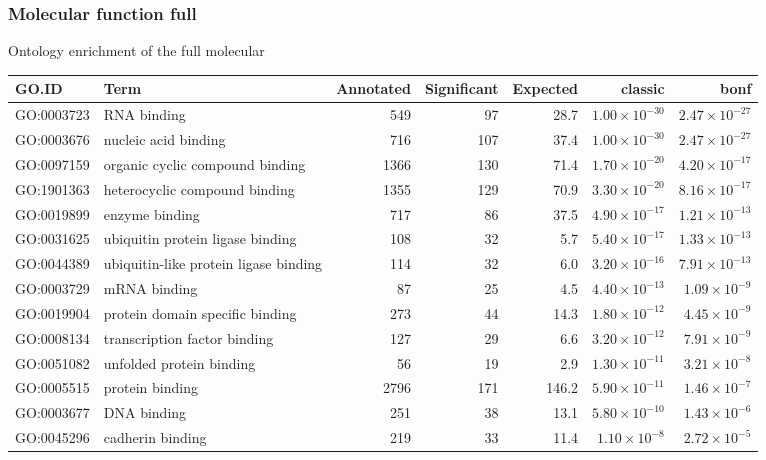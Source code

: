 \subsubsection{Molecular function full}
Ontology enrichment of the full molecular
\begin{table}[ht]
\centering
\begin{adjustbox}{max width=\textwidth}
\begin{tabular}{llrrrrr}
  \hline
GO.ID & Term & Annotated & Significant & Expected & classic & bonf \\ 
  \hline
GO:0003723 & RNA binding & 549 & 97 & 28.7 & $1.00 \times 10^{-30}$ & $2.47 \times 10^{-27}$ \\ 
  GO:0003676 & nucleic acid binding & 716 & 107 & 37.4 & $1.00 \times 10^{-30}$ & $2.47 \times 10^{-27}$ \\ 
  GO:0097159 & organic cyclic compound binding & 1366 & 130 & 71.4 & $1.70 \times 10^{-20}$ & $4.20 \times 10^{-17}$ \\ 
  GO:1901363 & heterocyclic compound binding & 1355 & 129 & 70.9 & $3.30 \times 10^{-20}$ & $8.16 \times 10^{-17}$ \\ 
  GO:0019899 & enzyme binding & 717 & 86 & 37.5 & $4.90 \times 10^{-17}$ & $1.21 \times 10^{-13}$ \\ 
  GO:0031625 & ubiquitin protein ligase binding & 108 & 32 & 5.7 & $5.40 \times 10^{-17}$ & $1.33 \times 10^{-13}$ \\ 
  GO:0044389 & ubiquitin-like protein ligase binding & 114 & 32 & 6.0 & $3.20 \times 10^{-16}$ & $7.91 \times 10^{-13}$ \\ 
  GO:0003729 & mRNA binding & 87 & 25 & 4.5 & $4.40 \times 10^{-13}$ & $1.09 \times 10^{-9}$ \\ 
  GO:0019904 & protein domain specific binding & 273 & 44 & 14.3 & $1.80 \times 10^{-12}$ & $4.45 \times 10^{-9}$ \\ 
  GO:0008134 & transcription factor binding & 127 & 29 & 6.6 & $3.20 \times 10^{-12}$ & $7.91 \times 10^{-9}$ \\ 
  GO:0051082 & unfolded protein binding & 56 & 19 & 2.9 & $1.30 \times 10^{-11}$ & $3.21 \times 10^{-8}$ \\ 
  GO:0005515 & protein binding & 2796 & 171 & 146.2 & $5.90 \times 10^{-11}$ & $1.46 \times 10^{-7}$ \\ 
  GO:0003677 & DNA binding & 251 & 38 & 13.1 & $5.80 \times 10^{-10}$ & $1.43 \times 10^{-6}$ \\ 
  GO:0045296 & cadherin binding & 219 & 33 & 11.4 & $1.10 \times 10^{-8}$ & $2.72 \times 10^{-5}$ \\ 

\end{tabular}
\end{adjustbox}
\end{table}

